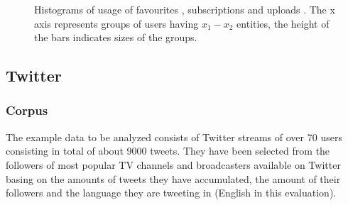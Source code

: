 \begin{figure}[ht]
  \centering
  \label{fig:subfigureExample}
  \caption{Histograms of usage of favourites , subscriptions
   and uploads . The x axis represents groups of
  users having $x_1-x_2$ entities, the height of the bars indicates sizes of the
  groups.}
\end{figure}

\newpage
\subsection{Twitter}
\subsubsection{Corpus}
The example data to be analyzed consists of Twitter streams of over 70 users
consisting in total of about 9000 tweets. They have been selected from the followers of most popular TV channels and broadcasters available on Twitter basing on the amounts of tweets they have accumulated, the amount of their followers and the language they are tweeting in (English in this evaluation).

